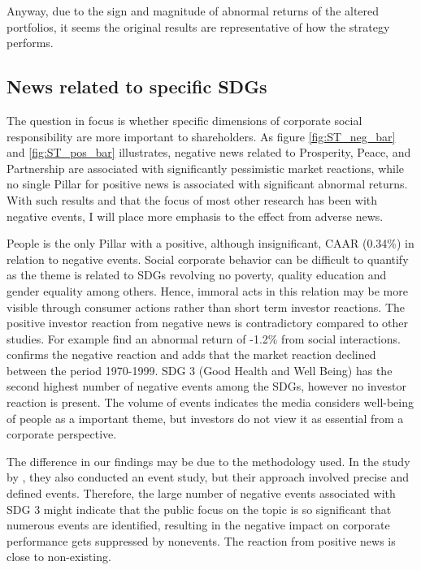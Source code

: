 Anyway, due to the sign and magnitude of abnormal returns of the altered portfolios, it seems the original results are representative of how the strategy performs. 


\subsection{News related to specific SDGs}

The question in focus is whether specific dimensions of corporate social responsibility are more important to shareholders. As figure \ref{fig:ST_neg_bar} and \ref{fig:ST_pos_bar} illustrates, negative news related to Prosperity, Peace, and Partnership are associated with significantly pessimistic market reactions, while no single Pillar for positive news is associated with significant abnormal returns. With such results and that the focus of most other research has been with negative events, I will place more emphasis to the effect from adverse news.

People is the only Pillar with a positive, although insignificant, CAAR (0.34\%) in relation to negative events. Social corporate behavior can be difficult to quantify as the theme is related to SDGs revolving no poverty, quality education and gender equality among others. Hence, immoral acts in this relation may be more visible through consumer actions rather than short term investor reactions. The positive investor reaction from negative news is contradictory compared to other studies. For example \cite{chen2001layoffs} find an abnormal return of -1.2\% from social interactions. \citep{farber2009changing} confirms the negative reaction and adds that the market reaction declined between the period 1970-1999. SDG 3 (Good Health and Well Being) has the second highest number of negative events among the SDGs, however no investor reaction is present. The volume of events indicates the media considers well-being of people as a important theme, but investors do not view it as essential from a corporate perspective.

The difference in our findings may be due to the methodology used. In the study by \citeauthor{chen2001layoffs}, they also conducted an event study, but their approach involved precise and defined events. Therefore, the large number of negative events associated with SDG 3 might indicate that the public focus on the topic is so significant that numerous events are identified, resulting in the negative impact on corporate performance gets suppressed by nonevents. The reaction from positive news is close to non-existing. 

